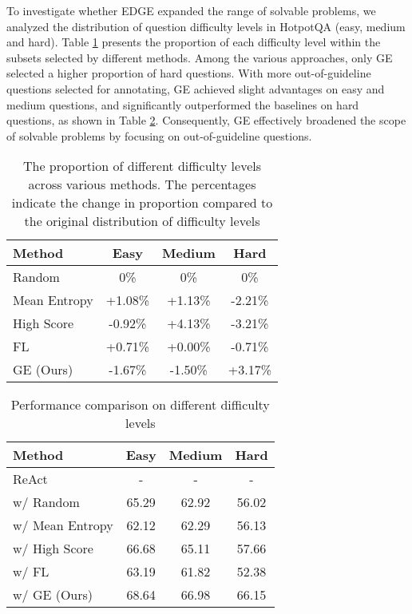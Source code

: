 To investigate whether EDGE expanded the range of solvable problems, we analyzed the distribution of question difficulty levels in HotpotQA (easy, medium and hard). Table \ref{tab:proportion} presents the proportion of each difficulty level within the subsets selected by different methods. Among the various approaches, only GE selected a higher proportion of hard questions. With more out-of-guideline questions selected for annotating, GE achieved slight advantages on easy and medium questions, and significantly outperformed the baselines on hard questions, as shown in Table \ref{tab:Performance-on-level}. Consequently, GE effectively broadened the scope of solvable problems by focusing on out-of-guideline questions.
\begin{table}[t]
    \centering
    \begin{tabular}{lccc}
        \toprule
        Method & \textbf{Easy} & \textbf{Medium} & \textbf{Hard} \\
        \midrule
        Random & 0\% & 0\% & 0\% \\
        Mean Entropy & +1.08\% & +1.13\% & -2.21\% \\
       High Score & -0.92\% & +4.13\% & -3.21\% \\
        FL & +0.71\% & +0.00\% & -0.71\% \\
        \midrule
        GE (Ours) & -1.67\% & -1.50\% & +3.17\% \\
        \bottomrule
    \end{tabular}
    \caption{The proportion of different difficulty levels across various methods. The percentages indicate the change in proportion compared to the original distribution of difficulty levels}
    \label{tab:proportion}
\end{table}

\begin{table}[t]
    \centering
    \begin{tabular}{lccc}
        \toprule
        \textbf{Method} & \textbf{Easy} & \textbf{Medium} & \textbf{Hard} \\
        \midrule
        ReAct &-&-&- \\
        \quad w/ Random & 65.29 & 62.92 & 56.02 \\
        \quad w/ Mean Entropy  & 62.12 & 62.29 & 56.13 \\
        \quad w/ High Score & 66.68 & 65.11 & 57.66 \\
        \quad w/ FL & 63.19 & 61.82 & 52.38 \\
        \midrule
        \quad w/ GE (Ours) & 68.64 & 66.98 & 66.15 \\
        \bottomrule
    \end{tabular}
    \caption{Performance comparison on different difficulty levels}
    \label{tab:Performance-on-level}
\end{table}



